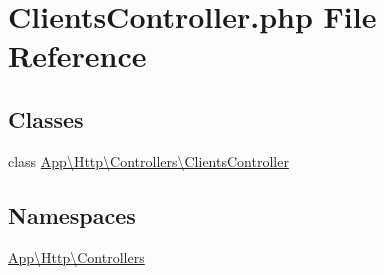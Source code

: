 \hypertarget{_clients_controller_8php}{}\section{Clients\+Controller.\+php File Reference}
\label{_clients_controller_8php}
\subsection*{Classes}
\begin{DoxyCompactItemize}
\item 
class \mbox{\hyperlink{class_app_1_1_http_1_1_controllers_1_1_clients_controller}{App\textbackslash{}\+Http\textbackslash{}\+Controllers\textbackslash{}\+Clients\+Controller}}
\end{DoxyCompactItemize}
\subsection*{Namespaces}
\begin{DoxyCompactItemize}
\item 
 \mbox{\hyperlink{namespace_app_1_1_http_1_1_controllers}{App\textbackslash{}\+Http\textbackslash{}\+Controllers}}
\end{DoxyCompactItemize}
